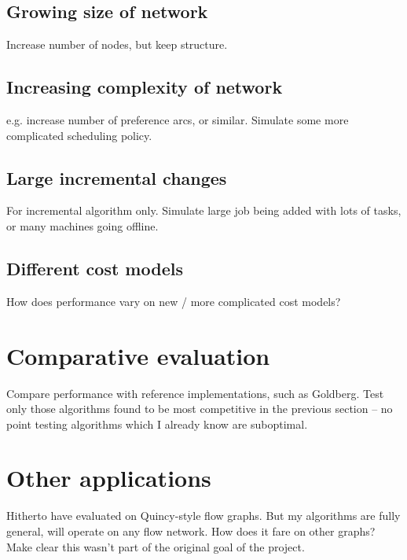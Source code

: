 \subsection{Growing size of network}

Increase number of nodes, but keep structure.

\subsection{Increasing complexity of network}

e.g. increase number of preference arcs, or similar. Simulate some more complicated scheduling policy.

\subsection{Large incremental changes}

For incremental algorithm only. Simulate large job being added with lots of tasks, or many machines going offline.

\subsection{Different cost models}

How does performance vary on new / more complicated cost models?

\section{Comparative evaluation} \label{sec:eval-comparative}

Compare performance with reference implementations, such as Goldberg. Test only those algorithms found to be most competitive in the previous section -- no point testing algorithms which I already know are suboptimal.

\section{Other applications}

Hitherto have evaluated on Quincy-style flow graphs. But my algorithms are fully general, will operate on any flow network. How does it fare on other graphs? Make clear this wasn't part of the original goal of the project.